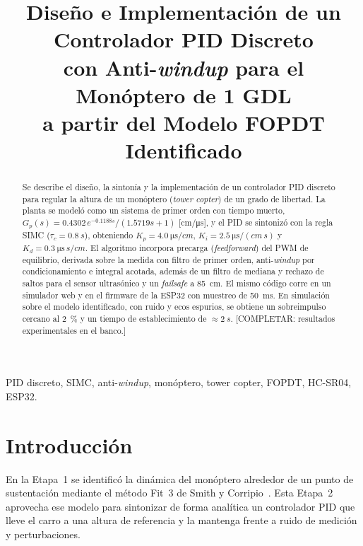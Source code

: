 \documentclass[conference,10pt]{IEEEtran}
\begin{document}
\title{Diseño e Implementación de un Controlador PID Discreto\\ con Anti-\textit{windup} para el Monóptero de 1 GDL\\ a partir del Modelo FOPDT Identificado}

\author{
}

\maketitle

\begin{abstract}
Se describe el diseño, la sintonía y la implementación de un controlador PID discreto para regular la altura de un monóptero (\textit{tower copter}) de un grado de libertad. La planta se modeló como un sistema de primer orden con tiempo muerto, $G_p(s)=0.4302\,e^{-0.1188s}/(1.5719s+1)$ [cm/\si{\micro\second}], y el PID se sintonizó con la regla SIMC ($\tau_c=\SI{0.8}{s}$), obteniendo $K_p=\SI{4.0}{\micro\second/cm}$, $K_i=\SI{2.5}{\micro\second/(cm\,s)}$ y $K_d=\SI{0.3}{\micro\second\,s/cm}$. El algoritmo incorpora precarga (\textit{feedforward}) del PWM de equilibrio, derivada sobre la medida con filtro de primer orden, anti-\textit{windup} por condicionamiento e integral acotada, además de un filtro de mediana y rechazo de saltos para el sensor ultrasónico y un \textit{failsafe} a \SI{85}{cm}. El mismo código corre en un simulador web y en el firmware de la ESP32 con muestreo de \SI{50}{ms}. En simulación sobre el modelo identificado, con ruido y ecos espurios, se obtiene un sobreimpulso cercano al \SI{2}{\percent} y un tiempo de establecimiento de $\approx\SI{2}{s}$. [COMPLETAR: resultados experimentales en el banco.]
\end{abstract}

\begin{IEEEkeywords}
PID discreto, SIMC, anti-\textit{windup}, monóptero, tower copter, FOPDT, HC-SR04, ESP32.
\end{IEEEkeywords}

\section{Introducción}
En la Etapa~1 se identificó la dinámica del monóptero alrededor de un punto de sustentación mediante el método Fit~3 de Smith y Corripio~\cite{smith}. Esta Etapa~2 aprovecha ese modelo para sintonizar de forma analítica un controlador PID que lleve el carro a una altura de referencia y la mantenga frente a ruido de medición y perturbaciones.
\end{document}
